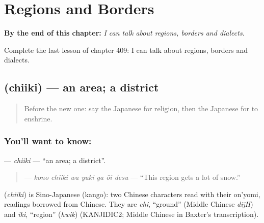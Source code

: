 
\chapter{Regions and Borders}
\label{ch:ja-regions-and-borders}

\begin{chapteropening}
\textbf{By the end of this chapter:} \emph{I can talk about regions, borders and dialects.}

Complete the last lesson of chapter 409: I can talk about regions, borders and dialects.
\end{chapteropening}

\section[\texorpdfstring{\ja{ちいき} (chiiki)}{ちいき (chiiki)}]{ (chiiki) — an area; a district}

\label{lesson:JA-C409-chiiki}



\begin{quote}
Before the new one: say the Japanese for religion, then the Japanese for to enshrine.
\end{quote}

\subsection*{You'll want to know: }
\textbf{} — \emph{chiiki} — \textquotedblleft{}an area; a district\textquotedblright{}.

\begin{quote}
\textbf{   } — \emph{kono chiiki wa yuki ga ōi desu} — \textquotedblleft{}This region gets a lot of snow.\textquotedblright{}
\end{quote}

\begin{cousinweb}
\textbf{} (\emph{chiiki}) is Sino-Japanese (kango): two Chinese characters read with their on'yomi, readings borrowed from Chinese. They are \emph{chi}, \textquotedblleft{}ground\textquotedblright{} (Middle Chinese \emph{dijH}) and \emph{iki}, \textquotedblleft{}region\textquotedblright{} (\emph{hwik}) (KANJIDIC2; Middle Chinese in Baxter's transcription).
\end{cousinweb}

